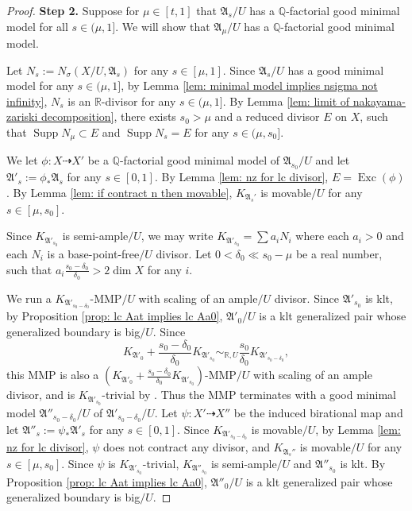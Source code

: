 \documentclass[12pt]{amsart}
\numberwithin{equation}{section}
\newcommand{\Rr}{\mathbb{R}}
\newcommand{\Exc}{\operatorname{Exc}}
\newcommand{\Supp}{\operatorname{Supp}}
\newcommand{\Aa}{{\mathfrak{A}}}
\theoremstyle{definition}
\theoremstyle{definition}
\theoremstyle{definition}
\begin{document}
\begin{proof}
\medskip

\noindent\textbf{Step 2.} 
   Suppose for $\mu \in [t, 1]$ that $\Aa_s/U$ has a $\mathbb Q$-factorial good minimal model for all $s \in (\mu, 1]$.  We will show that $\Aa_\mu/U$ has a $\mathbb Q$-factorial good minimal model.





Let $N_s:=N_{\sigma}(X/U,\Aa_s)$ for any $s\in [\mu,1]$. Since $\Aa_{s}/U$ has a good minimal model for any $s\in (\mu,1]$, by Lemma \ref{lem: minimal model implies nsigma not infinity}, $N_s$ is an $\Rr$-divisor for any $s\in (\mu,1]$. By Lemma \ref{lem: limit of nakayama-zariski decomposition}, there exists $s_0>\mu$ and a reduced divisor $E$ on $X$, such that $\Supp N_\mu\subset E$ and $\Supp N_s=E$ for any $s\in (\mu,s_0]$.

We let $\phi: X\dashrightarrow X'$ be a $\mathbb Q$-factorial good minimal model of $\Aa_{s_0}/U$ and let $\Aa'_s:=\phi_*\Aa_s$ for any $s\in [0,1]$. By Lemma \ref{lem: nz for lc divisor}, $E=\Exc(\phi)$. By Lemma \ref{lem: if contract n then movable}, $K_{\Aa_s'}$ is movable$/U$ for any $s\in [\mu,s_0]$. 


Since $K_{\Aa'_{s_0}}$ is semi-ample$/U$, we may write $K_{\Aa'_{s_0}}=\sum a_iN_i$ where each $a_i>0$ and each $N_i$ is a base-point-free$/U$ divisor. Let $0<\delta_0\ll s_0-\mu$ be a real number, such that $a_i\frac{s_0-\delta_0}{\delta_0}>2\dim X$ for any $i$.

We run a $K_{\Aa'_{s_0-\delta_0}}$-MMP$/U$ with scaling of an ample$/U$ divisor. Since $\Aa'_{s_0}$ is klt, by Proposition \ref{prop: lc Aat implies lc Aa0}, $\Aa'_0/U$ is a klt generalized pair whose generalized boundary is big$/U$. Since
$$K_{\Aa'_0}+\frac{s_0-\delta_0}{\delta_0}K_{\Aa'_{s_0}}\sim_{\mathbb R,U}\frac{s_0}{\delta_0}K_{\Aa'_{s_0-\delta_0}},$$
this MMP is also a $(K_{\Aa'_0}+\frac{s_0-\delta_0}{\delta_0}K_{\Aa'_{s_0}})$-MMP$/U$ with scaling of an ample divisor, and is $K_{\Aa'_{s_0}}$-trivial by \cite[Lemma 4.4(3)]{BZ16}.  Thus the MMP terminates with a good minimal model $\Aa''_{s_0-\delta_0}/U$ of $\Aa'_{s_0-\delta_0}/U$. Let $\psi: X'\dashrightarrow X''$ be the induced birational map and let $\Aa''_s:=\psi_*\Aa'_s$ for any $s\in [0,1]$. Since $K_{\Aa'_{s_0-\delta_0}}$ is movable$/U$, by Lemma \ref{lem: nz for lc divisor}, $\psi$ does not contract any divisor, and $K_{\Aa_s''}$
is movable$/U$ for any $s\in [\mu,s_0]$. Since $\psi$ is $K_{\Aa'_{s_0}}$-trivial, $K_{\Aa''_{s_0}}$ is semi-ample$/U$ and $\Aa''_{s_0}$ is klt. By Proposition \ref{prop: lc Aat implies lc Aa0}, $\Aa''_{0}/U$ is a klt generalized pair whose generalized boundary is big$/U$.


\end{proof}
\end{document}
